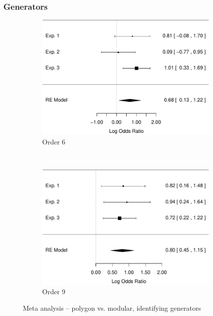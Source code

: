\documentclass[man,10pt]{apa6}
\begin{document}
\subsubsection{Generators}
\begin{figure}
\centering
\begin{subfigure}[c]{0.4\textwidth}
\centering
\includegraphics[width=\textwidth]{figures/meta/question_typegenerator_true_6_conditionpolygon.pdf}
\caption{Order 6}
\end{subfigure}
~
\begin{subfigure}[c]{0.4\textwidth}
\centering
\includegraphics[width=\textwidth]{figures/meta/question_typegenerator_true_9_conditionpolygon.pdf}
\caption{Order 9}
\end{subfigure}
\caption{Meta analysis -- polygon vs. modular, identifying generators}
\label{meta_genT_p}
\end{figure}\noindent 
\end{document}
